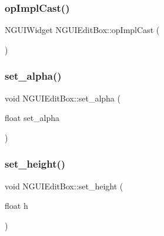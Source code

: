 \hypertarget{class_n_g_u_i_edit_box_a567fb6b20702ed4de15b4c02d24693f1}{}\label{class_n_g_u_i_edit_box_a567fb6b20702ed4de15b4c02d24693f1} 
\subsubsection{\texorpdfstring{op\+Impl\+Cast()}{opImplCast()}}
{\footnotesize\ttfamily N\+G\+U\+I\+Widget N\+G\+U\+I\+Edit\+Box\+::op\+Impl\+Cast (\begin{DoxyParamCaption}{ }\end{DoxyParamCaption})}

\hypertarget{class_n_g_u_i_edit_box_a92e02f5a7c26be429d44b6c53537a2c1}{}\label{class_n_g_u_i_edit_box_a92e02f5a7c26be429d44b6c53537a2c1} 
\subsubsection{\texorpdfstring{set\+\_\+alpha()}{set\_alpha()}}
{\footnotesize\ttfamily void N\+G\+U\+I\+Edit\+Box\+::set\+\_\+alpha (\begin{DoxyParamCaption}\item[{float}]{set\+\_\+alpha }\end{DoxyParamCaption})}

\hypertarget{class_n_g_u_i_edit_box_a83be17c58304a5527a8ba54970ab8c55}{}\label{class_n_g_u_i_edit_box_a83be17c58304a5527a8ba54970ab8c55} 
\subsubsection{\texorpdfstring{set\+\_\+height()}{set\_height()}}
{\footnotesize\ttfamily void N\+G\+U\+I\+Edit\+Box\+::set\+\_\+height (\begin{DoxyParamCaption}\item[{float}]{h }\end{DoxyParamCaption})}

\hypertarget{class_n_g_u_i_edit_box_a971d2cd140f8d4fb241f3f341be3204f}{}\label{class_n_g_u_i_edit_box_a971d2cd140f8d4fb241f3f341be3204f} 

